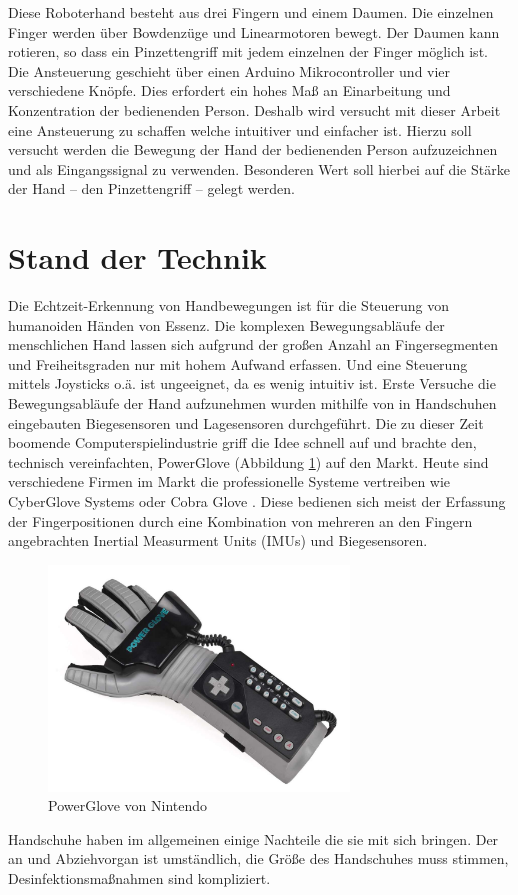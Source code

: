 \documentclass[a4paper,12pt,final]{article} %
\numberwithin{equation}{section} %
\numberwithin{figure}{section} %
\numberwithin{table}{section} %
\begin{document}
Diese Roboterhand besteht aus drei Fingern und einem Daumen. Die einzelnen Finger werden über Bowdenzüge und Linearmotoren bewegt. Der Daumen kann rotieren, so dass ein Pinzettengriff mit jedem einzelnen der Finger möglich ist.
Die Ansteuerung geschieht über einen Arduino Mikrocontroller und vier verschiedene Knöpfe. Dies erfordert ein hohes Maß an Einarbeitung und Konzentration der bedienenden Person.
Deshalb wird versucht mit dieser Arbeit eine Ansteuerung zu schaffen welche intuitiver und einfacher ist. Hierzu soll versucht werden die Bewegung der Hand der bedienenden Person auf\-zu\-zeich\-nen und als Eingangssignal zu verwenden.
Besonderen Wert soll hierbei auf die Stärke der Hand -- den Pinzettengriff -- gelegt werden.
\newpage
\section{Stand der Technik}

Die Echtzeit-Erkennung von Handbewegungen ist für die Steuerung von humanoiden Händen von Essenz. Die komplexen Bewegungsabläufe der menschlichen Hand lassen sich aufgrund der großen Anzahl an Fingersegmenten und Freiheitsgraden nur mit hohem Aufwand erfassen. Und eine Steuerung mittels Joysticks o.ä. ist ungeeignet, da es wenig intuitiv ist.
Erste Versuche die Bewegungsabläufe der Hand aufzunehmen wurden mithilfe von in Handschuhen eingebauten Biegesensoren \cite{FlexSensor} und Lagesensoren durchgeführt.  Die zu dieser Zeit boomende Computerspielindustrie griff die Idee schnell auf und brachte den, technisch vereinfachten, PowerGlove \cite{PowerGlove} (Abbildung \ref{fig:PowerGlove}) auf den Markt. Heute sind verschiedene Firmen im Markt die professionelle Systeme vertreiben wie CyberGlove Systems \cite{CyberGlove} oder Cobra Glove \cite{CobraGlove}. Diese bedienen sich meist der Erfassung der Fin\-ger\-pos\-ition\-en durch eine Kombination von mehreren an den Fingern angebrachten Inertial Measurment Units (IMUs) und Biegesensoren.
\begin{figure}[H]
	\begin{center}
		 \includegraphics[width=8cm]{Bilder/nintendo-power-glove.jpg}
		 \caption{PowerGlove von Nintendo \cite{NintendoGlove}}
		 \label{fig:PowerGlove} 
	\end{center}
\end{figure}
Handschuhe haben im allgemeinen einige Nachteile die sie mit sich bringen. Der an und Abziehvorgan ist umständlich, die Größe des Handschuhes muss stimmen, Des\-in\-fek\-tions\-maß\-nahmen sind kompliziert.
\end{document}
